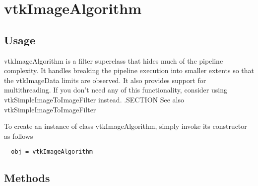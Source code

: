 \section{vtkImageAlgorithm}

\subsection{Usage}

 vtkImageAlgorithm is a filter superclass that hides much of the 
 pipeline  complexity. It handles breaking the pipeline execution 
 into smaller extents so that the vtkImageData limits are observed. It 
 also provides support for multithreading. If you don't need any of this
 functionality, consider using vtkSimpleImageToImageFilter instead.
 .SECTION See also
 vtkSimpleImageToImageFilter

To create an instance of class vtkImageAlgorithm, simply
invoke its constructor as follows
\begin{verbatim}
  obj = vtkImageAlgorithm
\end{verbatim}
\subsection{Methods}

